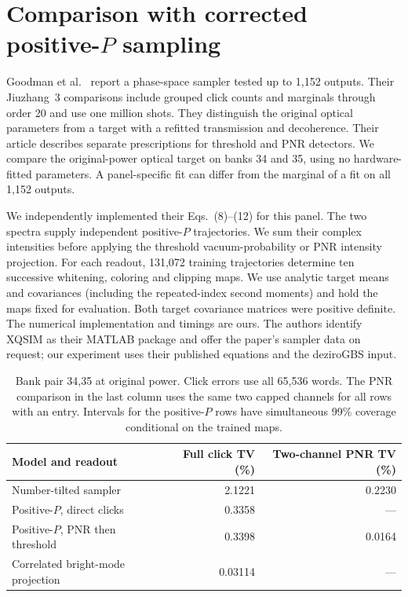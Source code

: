 \documentclass[11pt]{article}
\begin{document}
\section{Comparison with corrected positive-\texorpdfstring{$P$}{P} sampling}\label{sec:positivep}
Goodman et al.~\cite{goodman} report a phase-space sampler tested up to 1,152 outputs. Their Jiuzhang~3 comparisons include grouped click counts and marginals through order 20 and use one million shots. They distinguish the original optical parameters from a target with a refitted transmission and decoherence. Their article describes separate prescriptions for threshold and PNR detectors. We compare the original-power optical target on banks 34 and 35, using no hardware-fitted parameters. A panel-specific fit can differ from the marginal of a fit on all 1,152 outputs.

We independently implemented their Eqs.~(8)--(12) for this panel. The two spectra supply independent positive-$P$ trajectories. We sum their complex intensities before applying the threshold vacuum-probability or PNR intensity projection. For each readout, 131,072 training trajectories determine ten successive whitening, coloring and clipping maps. We use analytic target means and covariances (including the repeated-index second moments) and hold the maps fixed for evaluation. Both target covariance matrices were positive definite. The numerical implementation and timings are ours. The authors identify XQSIM as their MATLAB package and offer the paper's sampler data on request; our experiment uses their published equations and the deziroGBS input.

\begin{table}[ht]
\centering\small
\caption{Bank pair 34,35 at original power. Click errors use all 65,536 words. The PNR comparison in the last column uses the same two capped channels for all rows with an entry. Intervals for the positive-$P$ rows have simultaneous 99\% coverage conditional on the trained maps.}
\begin{tabular}{lrr}
\toprule
Model and readout & Full click TV (\%) & Two-channel PNR TV (\%)\\
\midrule
Number-tilted sampler & 2.1221 & 0.2230\\
Positive-$P$, direct clicks & 0.3358 \quad [0.0806, 0.5105] & ---\\
Positive-$P$, PNR then threshold & 0.3398 \quad [0.0952, 0.5145] & 0.0164 \quad [0, 0.1911]\\
Correlated bright-mode projection & 0.03114 & ---\\
\bottomrule
\end{tabular}
\label{tab:positivep}
\end{table}
\end{document}
